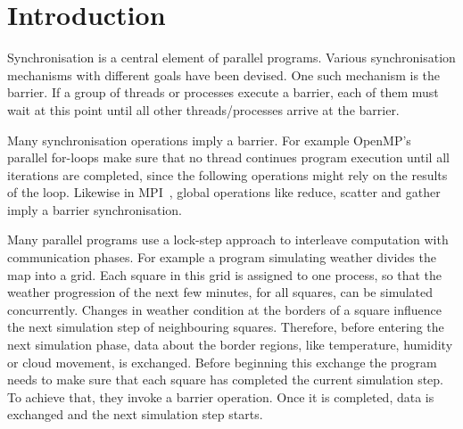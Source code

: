 \documentclass[a4paper, 10pt]{article}
\begin{document}

\section{Introduction}
\label{sec:introduction}
Synchronisation is a central element of parallel programs. Various synchronisation mechanisms with different goals have been devised. One such mechanism is the barrier. If a group of threads or processes execute a barrier, each of them must wait at this point until all other threads/processes arrive at the barrier.

Many synchronisation operations imply a barrier. For example OpenMP's~\cite{openmp} parallel for-loops make sure that no thread continues program execution until all iterations are completed, since the following operations might rely on the results of the loop. Likewise in MPI~\cite{mpiforum}, global operations like reduce, scatter and gather imply a barrier synchronisation.

Many parallel programs use a lock-step approach to interleave computation with communication phases.
For example a program simulating weather divides the map into a grid.
Each square in this grid is assigned to one process, so that the weather progression of the next few minutes, for all squares, can be simulated concurrently.
Changes in weather condition at the borders of a square influence the next simulation step of neighbouring squares.
Therefore, before entering the next simulation phase, data about the border regions, like temperature, humidity or cloud movement, is exchanged.
Before beginning this exchange the program needs to make sure that each square has completed the current simulation step. To achieve that, they invoke a barrier operation.
Once it is completed, data is exchanged and the next simulation step starts.
\end{document}
